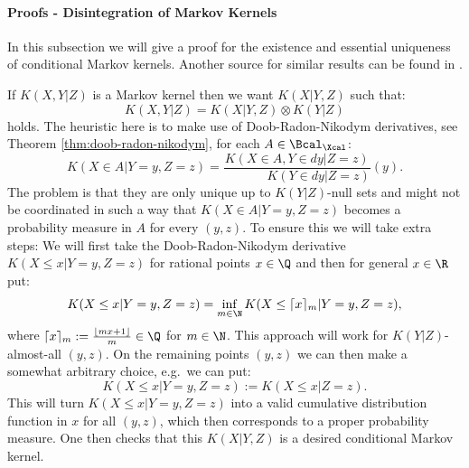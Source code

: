 \paragraph{Proofs - Disintegration of Markov Kernels}

In this subsection we will give a proof for the existence and essential uniqueness of conditional Markov kernels.
Another source for similar results can be found in \cite{Kal17}.


\begin{Rem}
    If $ K(X,Y|Z)$ is a Markov kernel then we want $ K(X|Y,Z)$ such that:
    \[ K(X,Y|Z) =  K(X|Y,Z) \otimes  K(Y|Z)\]
    holds. The heuristic here is to make use of Doob-Radon-Nikodym derivatives, see Theorem \ref{thm:doob-radon-nikodym}, 
    for each $A \in \Bcal_\Xcal$:
    \[  K(X \in A| Y=y,Z=z) = \frac{ K(X \in A,Y \in dy |Z=z)}{\phantom{X\in A,\,} K(Y \in dy|Z=z)}(y).  \]
    The problem is that they are only unique up to $K(Y|Z)$-null sets and might not be coordinated in such a way
    that $K(X \in A| Y=y,Z=z)$ becomes a probability measure in $A$ for every $(y,z)$. 
    To ensure this we will take extra steps: 
    We will first take the Doob-Radon-Nikodym derivative
    $K(X \le x| Y=y,Z=z)$ for rational points $x \in \Q$
    and then for general $x \in \R$ put:
    \[  K(X \le x| Y=y,Z=z) =
            \inf_{m \in \N} K(X \le \lceil x\rceil_m| Y=y,Z=z),
    \]
    where $ \lceil x\rceil_m:=\frac{\lfloor mx+1\rfloor}{m} \in \Q$ for $m \in \N$.
    This approach will work for $K(Y|Z)$-almost-all $(y,z)$.
    On the remaining points $(y,z)$  we can then make a somewhat arbitrary choice, e.g.\ we can put:
    \[ K(X \le x|Y=y,Z=z) :=  K(X\le x|Z=z).\]
    This will turn $K(X \le x|Y=y,Z=z)$ into a valid cumulative distribution function in $x$ for all $(y,z)$, 
    which then corresponds to a proper probability measure.
    One then checks that this $K(X|Y,Z)$ is a desired conditional Markov kernel.
\end{Rem}



